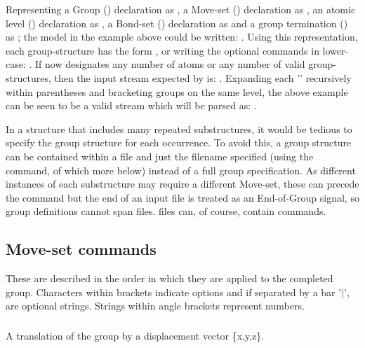 Representing
a Group () declaration as  , 
a Move-set () declaration as  , 
an atomic level () declaration as  ,
a Bond-set () declaration as  and
a group termination () as ;
the model in the example above could be written:
.   Using this representation, each group-structure has the 
form , or writing the optional commands in lower-case:  .
If \Tt{*} now designates any number of atoms or any number of valid group-structures,
then the input stream expected by  is: . 
Expanding each '\Tt{*}' recursively within parentheses and bracketing groups on the same 
level, the above example can be seen to be a valid stream which will be parsed as:
.

In a structure that includes many repeated substructures, it would be tedious to 
specify the group structure for each occurrence.  To avoid this, a group structure can
be contained within a file and just the filename specified (using the  command,
of which more below) instead of a full group specification.  As different instances of
each substructure may require a different Move-set, these can precede the 
command but the end of an input file is treated as an End-of-Group signal, so group
definitions cannot span files.     files can, of course, contain 
commands.

\subsection{Move-set commands}

These are described in the order in which they are applied to the completed group.
Characters within brackets indicate options and if separated by a bar '$\mid$', are optional
strings.  Strings within angle brackets represent numbers.

\subsubsection{}

A translation of the group by a displacement vector \{x,y,z\}. 

\subsubsection{}

